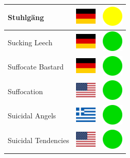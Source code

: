 \documentclass[12pt, a4paper, twoside]{report}
\begin{document}
\begin{center}
\begin{longtable}{|p{5cm}|p{2cm}|p{2cm}|}
 Stuhlgäng                                                  & \includegraphics[width=1cm]{../img/flags/de} &   \includegraphics[width=1cm]{../likes/m} \\ \hline
 Sucking Leech                                              & \includegraphics[width=1cm]{../img/flags/de} &   \includegraphics[width=1cm]{../likes/y} \\ \hline
 Suffocate Bastard                                          & \includegraphics[width=1cm]{../img/flags/de} &   \includegraphics[width=1cm]{../likes/y} \\ \hline
 Suffocation                                                & \includegraphics[width=1cm]{../img/flags/us} &   \includegraphics[width=1cm]{../likes/y} \\ \hline
 Suicidal Angels                                            & \includegraphics[width=1cm]{../img/flags/gr} &   \includegraphics[width=1cm]{../likes/y} \\ \hline
 Suicidal Tendencies                                        & \includegraphics[width=1cm]{../img/flags/us} &   \includegraphics[width=1cm]{../likes/y} \\ \hline

\end{longtable}
\end{center}
\end{document}
